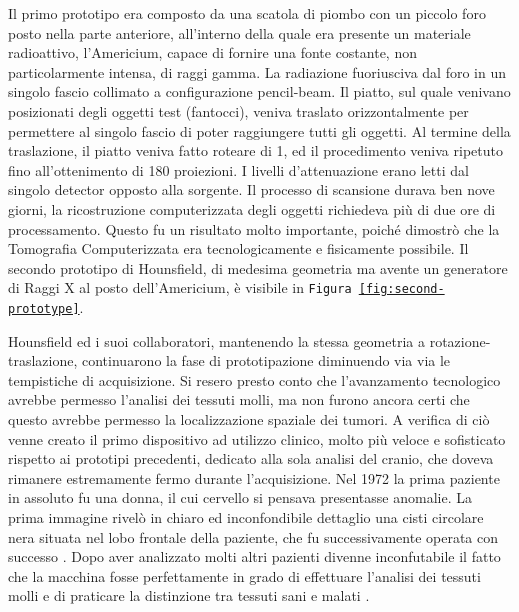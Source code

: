 \documentclass[a4paper,12pt, doubleside]{report}
\begin{document}
                    Il primo prototipo era composto da una scatola di piombo con un piccolo foro posto nella parte anteriore, all’interno della quale era presente un materiale radioattivo, l’Americium, capace di fornire una fonte costante, non particolarmente intensa, di raggi gamma. La radiazione fuoriusciva dal foro in un singolo fascio collimato a configurazione pencil-beam. Il piatto, sul quale venivano posizionati degli oggetti test (fantocci), veniva traslato orizzontalmente per permettere al singolo fascio di poter raggiungere tutti gli oggetti. Al termine della traslazione, il piatto veniva fatto roteare di 1\degree, ed il procedimento veniva ripetuto fino all'ottenimento di 180 proiezioni. I livelli d'attenuazione erano letti dal singolo detector opposto alla sorgente. Il processo di scansione durava ben nove giorni, la ricostruzione computerizzata degli oggetti richiedeva più di due ore di processamento. Questo fu un risultato molto importante, poiché dimostrò che la Tomografia Computerizzata era tecnologicamente e fisicamente possibile. Il secondo prototipo di Hounsfield, di medesima geometria ma avente un generatore di Raggi X al posto dell'Americium, è visibile in \texttt{Figura \ref{fig:second-prototype}}.
                
                \bigskip
                \par
                    Hounsfield ed i suoi collaboratori, mantenendo la stessa geometria a rotazione-traslazione, continuarono la fase di prototipazione diminuendo via via le tempistiche di acquisizione. Si resero presto conto che l'avanzamento tecnologico avrebbe permesso l'analisi dei tessuti molli, ma non furono ancora certi che questo avrebbe permesso la localizzazione spaziale dei tumori. A verifica di ciò venne creato il primo dispositivo ad utilizzo clinico, molto più veloce e sofisticato rispetto ai prototipi precedenti, dedicato alla sola analisi del cranio, che doveva rimanere estremamente fermo durante l'acquisizione. Nel 1972 la prima paziente in assoluto fu una donna, il cui cervello si pensava presentasse anomalie. La prima immagine rivelò in chiaro ed inconfondibile dettaglio una cisti circolare nera situata nel lobo frontale della paziente, che fu successivamente operata con successo \cite{scanner-story}. Dopo aver analizzato molti altri pazienti divenne inconfutabile il fatto che la macchina fosse perfettamente in grado di effettuare l'analisi dei tessuti molli e di praticare la distinzione tra tessuti sani e malati \cite{hounsfield-nobel-lecture}.
                    
\end{document}
